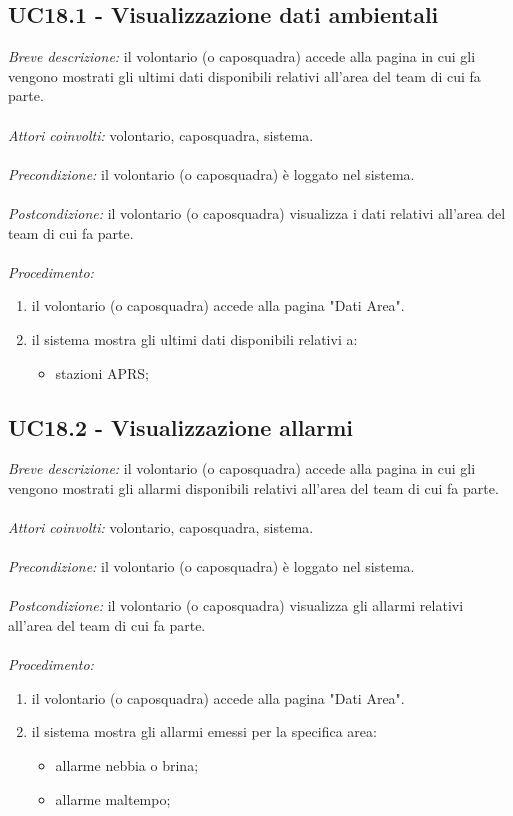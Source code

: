 \subsection{UC18.1 - Visualizzazione dati ambientali}
\textit{Breve descrizione:} il volontario (o caposquadra) accede alla pagina in cui gli vengono mostrati gli ultimi dati disponibili relativi all'area del team di cui fa parte. 
\\
\\
\textit{Attori coinvolti:} volontario, caposquadra, sistema.
\\
\\
\textit{Precondizione:} il volontario (o caposquadra) è loggato nel sistema.
\\
\\
\textit{Postcondizione:} il volontario (o caposquadra) visualizza i dati relativi all'area del team di cui fa parte.
\\
\\
\textit{Procedimento:}
\begin{enumerate}
	\item il volontario (o caposquadra) accede alla pagina "Dati Area".
	\item il sistema mostra gli ultimi dati disponibili relativi a:
	\begin{itemize}
		\item stazioni APRS;
	\end{itemize}
\end{enumerate}

\subsection{UC18.2 - Visualizzazione allarmi}
\textit{Breve descrizione:} il volontario (o caposquadra) accede alla pagina in cui gli vengono mostrati gli allarmi disponibili relativi all'area del team di cui fa parte. 
\\
\\
\textit{Attori coinvolti:} volontario, caposquadra, sistema.
\\
\\
\textit{Precondizione:} il volontario (o caposquadra) è loggato nel sistema.
\\
\\
\textit{Postcondizione:} il volontario (o caposquadra) visualizza gli allarmi relativi all'area del team di cui fa parte.
\\
\\
\textit{Procedimento:}
\begin{enumerate}
	\item il volontario (o caposquadra) accede alla pagina "Dati Area".
	\item il sistema mostra gli allarmi emessi per la specifica area:
	\begin{itemize}
		\item allarme nebbia o brina;
		\item allarme maltempo;
	\end{itemize}
\end{enumerate}

